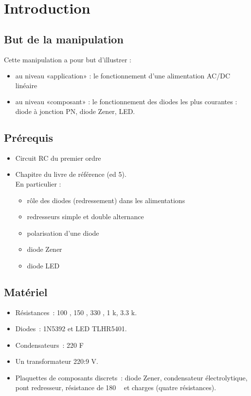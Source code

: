 \documentclass{../template/labo}
\author{The Fantastic Four}
\begin{document}

\section{Introduction}

\subsection{But de la manipulation}
Cette manipulation a pour but d'illustrer :
\begin{itemize}
\item au niveau «application» : le fonctionnement d'une alimentation AC/DC linéaire
\item au niveau «composant» : le fonctionnement des diodes les plus courantes : diode à jonction PN, diode Zener, LED.
\end{itemize}

\subsection{Prérequis}
\begin{itemize}
\item Circuit RC du premier ordre
\item Chapitre  du livre de référence (ed 5).\\ En particulier :
\begin{itemize}
\item rôle des diodes (redressement) dans les alimentations
\item redresseurs simple et double alternance
\item polarisation d'une diode
\item diode Zener
\item diode LED
\end{itemize}



\end{itemize}


\subsection{Matériel}
\begin{itemize}
\item Résistances~: 100 \ohm, 150 \ohm, 330 \ohm, 1 k\ohm, 3.3 k\ohm.
\item Diodes~: 1N5392 et LED TLHR5401.
\item Condensateurs~: 220 \textmu F
\item Un transformateur 220:9 V.
\item Plaquettes de composants discrets~: diode Zener, condensateur électrolytique, pont redresseur, résistance de 180 \ohm~ et charges (quatre résistances).
\end{itemize}
\end{document}
